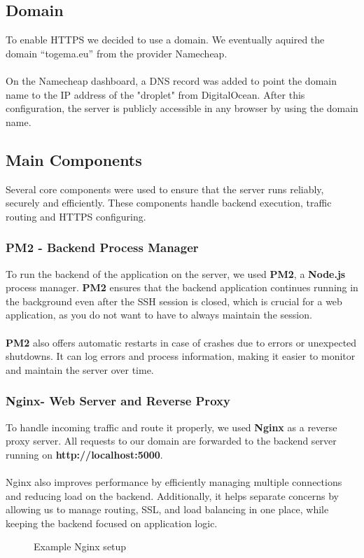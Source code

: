 \documentclass[a4paper,12pt]{report}
\begin{document}
\subsection{Domain}
To enable HTTPS we decided to use a domain. We eventually aquired the domain “togema.eu” from the provider Namecheap.\\\\
On the Namecheap dashboard, a DNS record was added to point the domain name to the IP address of the "droplet" from DigitalOcean. After this configuration, the server is publicly accessible in any browser by using the domain name.
\subsection{Main Components}
Several core components were used to ensure that the server runs reliably, securely and efficiently. These components handle backend execution, traffic routing and HTTPS configuring.
\subsubsection{PM2 - Backend Process Manager}
To run the backend of the application on the server, we used \textbf{PM2}, a \textbf{Node.js} process manager. \textbf{PM2} ensures that the backend application continues running in the background even after the SSH session is closed, which is crucial for a web application, as you do not want to have to always maintain the session.\\\\
\textbf{PM2} also offers automatic restarts in case of crashes due to errors or unexpected shutdowns. It can log errors and process information, making it easier to monitor and maintain the server over time.
\subsubsection{Nginx- Web Server and Reverse Proxy}
To handle incoming traffic and route it properly, we used \textbf{Nginx} as a reverse proxy server. All requests to our domain are forwarded to the backend server running on \textbf{http://localhost:5000}.\\\\
Nginx also improves performance by efficiently managing multiple connections and reducing load on the backend. Additionally, it helps separate concerns by allowing us to manage routing, SSL, and load balancing in one place, while keeping the backend focused on application logic.
\begin{figure}[h!]
	\caption{Example Nginx setup}
	\label{fig:user_defined_characteristics}
\end{figure}
\end{document}
